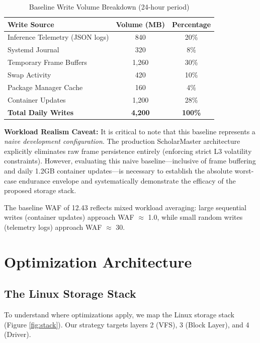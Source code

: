 \documentclass[conference]{IEEEtran}
\begin{document}
\begin{table}[h]
\caption{Baseline Write Volume Breakdown (24-hour period)}
\begin{center}
\begin{tabular}{lcc}
\toprule
\textbf{Write Source} & \textbf{Volume (MB)} & \textbf{Percentage} \\
\midrule
Inference Telemetry (JSON logs) & 840 & 20\% \\
Systemd Journal & 320 & 8\% \\
Temporary Frame Buffers & 1,260 & 30\% \\
Swap Activity & 420 & 10\% \\
Package Manager Cache & 160 & 4\% \\
Container Updates & 1,200 & 28\% \\
\bottomrule
\textbf{Total Daily Writes} & \textbf{4,200} & \textbf{100\%} \\
\end{tabular}
\end{center}
\label{tab:baseline}
\end{table}

\textbf{Workload Realism Caveat:} It is critical to note that this baseline represents a \textit{naive development configuration}. The production ScholarMaster architecture explicitly eliminates raw frame persistence entirely (enforcing strict L3 volatility constraints). However, evaluating this naive baseline—inclusive of frame buffering and daily 1.2GB container updates—is necessary to establish the absolute worst-case endurance envelope and systematically demonstrate the efficacy of the proposed storage stack.

The baseline WAF of 12.43 reflects mixed workload averaging: large sequential writes (container updates) approach WAF $\approx$ 1.0, while small random writes (telemetry logs) approach WAF $\approx$ 30. 

\section{Optimization Architecture}

\subsection{The Linux Storage Stack}

To understand where optimizations apply, we map the Linux storage stack (Figure \ref{fig:stack}). Our strategy targets layers 2 (VFS), 3 (Block Layer), and 4 (Driver).
\end{document}
